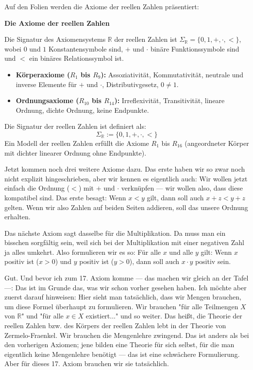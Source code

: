 \begin{meta-note}
Auf den Folien werden die Axiome der reellen Zahlen präsentiert:
\begin{center}
\textbf{Die Axiome der reellen Zahlen}
\end{center}
Die Signatur des Axiomensystems $\mathbb{R}$ der reellen Zahlen ist $\Sigma_{\mathbb{R}} = \{0, 1, +, \cdot, <\}$, wobei $0$ und $1$ Konstantensymbole sind, $+$ und $\cdot$ binäre Funktionssymbole sind und $<$ ein binäres Relationssymbol ist.
\begin{itemize}
    \item \textbf{Körperaxiome ($R_1$ bis $R_9$):} Assoziativität, Kommutativität, neutrale und inverse Elemente für $+$ und $\cdot$, Distributivgesetz, $0 \neq 1$.
    \item \textbf{Ordnungsaxiome ($R_{10}$ bis $R_{14}$):} Irreflexivität, Transitivität, lineare Ordnung, dichte Ordnung, keine Endpunkte.
\end{itemize}
\end{meta-note}

\begin{math-stroke}
Die Signatur der reellen Zahlen ist definiert als:
\[
\Sigma_{\mathbb{R}} := \{0, 1, +, \cdot, <\}
\]
Ein Modell der reellen Zahlen erfüllt die Axiome $R_1$ bis $R_{16}$ (angeordneter Körper mit dichter linearer Ordnung ohne Endpunkte).
\end{math-stroke}

\begin{spoken-clean}[00:15:45 - 00:17:40]
Jetzt kommen noch drei weitere Axiome dazu. Das erste haben wir so zwar noch nicht explizit hingeschrieben, aber wir kennen es eigentlich auch: Wir wollen jetzt einfach die Ordnung ($<$) mit $+$ und $\cdot$ verknüpfen --- wir wollen also, dass diese kompatibel sind. Das erste besagt: Wenn $x < y$ gilt, dann soll auch $x + z < y + z$ gelten. Wenn wir also Zahlen auf beiden Seiten addieren, soll das unsere Ordnung erhalten.

Das nächste Axiom sagt dasselbe für die Multiplikation. Da muss man ein bisschen sorgfältig sein, weil sich bei der Multiplikation mit einer negativen Zahl ja alles umkehrt. Also formulieren wir es so: Für alle $x$ und alle $y$ gilt: Wenn $x$ positiv ist ($x > 0$) und $y$ positiv ist ($y > 0$), dann soll auch $x \cdot y$ positiv sein.

Gut. Und bevor ich zum 17. Axiom komme --- das machen wir gleich an der Tafel ---: Das ist im Grunde das, was wir schon vorher gesehen haben. Ich möchte aber zuerst darauf hinweisen: Hier sieht man tatsächlich, dass wir Mengen brauchen, um diese Formel überhaupt zu formulieren. Wir brauchen "für alle Teilmengen $X$ von $\mathbb{R}$" und "für alle $x \in X$ existiert..." und so weiter. Das heißt, die Theorie der reellen Zahlen bzw. des Körpers der reellen Zahlen lebt in der Theorie von Zermelo-Fraenkel. Wir brauchen die Mengenlehre zwingend. Das ist anders als bei den vorherigen Axiomen; jene bilden eine Theorie für sich selbst, für die man eigentlich keine Mengenlehre benötigt --- das ist eine schwächere Formulierung. Aber für dieses 17. Axiom brauchen wir sie tatsächlich.
\end{spoken-clean}

